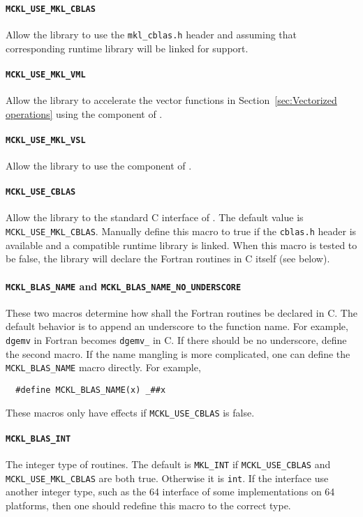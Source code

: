 \paragraph{\texttt{MCKL\_USE\_MKL\_CBLAS}} Allow the library to use the
\verb|mkl_cblas.h| header and assuming that corresponding runtime library will
be linked for \blas support.

\paragraph{\texttt{MCKL\_USE\_MKL\_VML}} Allow the library to accelerate the
vector functions in Section~\ref{sec:Vectorized operations} using the \vml
component of \mkl.

\paragraph{\texttt{MCKL\_USE\_MKL\_VSL}} Allow the library to use the \vsl
component of \mkl.

\paragraph{\texttt{MCKL\_USE\_CBLAS}} Allow the library to the standard C
interface of \blas. The default value is \verb|MCKL_USE_MKL_CBLAS|. Manually
define this macro to true if the \verb|cblas.h| header is available and a
compatible runtime library is linked. When this macro is tested to be false,
the library will declare the \blas Fortran routines in C itself (see below).

\paragraph{\texttt{MCKL\_BLAS\_NAME} and
  \texttt{MCKL\_BLAS\_NAME\_NO\_UNDERSCORE}} These two macros determine how
shall the \blas Fortran routines be declared in C. The default behavior is to
append an underscore to the function name. For example, \verb|dgemv| in Fortran
becomes \verb|dgemv_| in C. If there should be no underscore, define the second
macro. If the name mangling is more complicated, one can define the
\verb|MCKL_BLAS_NAME| macro directly. For example,
\begin{Verbatim}
  #define MCKL_BLAS_NAME(x) _##x
\end{Verbatim}
These macros only have effects if \verb|MCKL_USE_CBLAS| is false.

\paragraph{\texttt{MCKL\_BLAS\_INT}} The integer type of \blas routines. The
default is \verb|MKL_INT| if \verb|MCKL_USE_CBLAS| and
\verb|MCKL_USE_MKL_CBLAS| are both true. Otherwise it is \verb|int|. If the
\blas interface use another integer type, such as the \ilp{}64 interface of
some implementations on \lp{}64 platforms, then one should redefine this macro
to the correct type.

